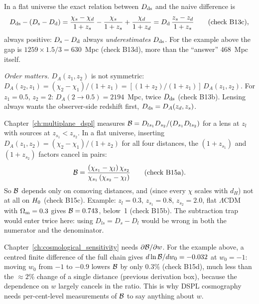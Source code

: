 \begin{annotation}
In a flat universe the exact relation between $D_{\mathrm{ds}}$ and the naive difference is
\[
  D_{\mathrm{ds}} - (D_{\mathrm{s}} - D_{\mathrm{d}}) = \frac{\chi_s - \chi_d}{1+z_s} - \frac{\chi_s}{1+z_s}
  + \frac{\chi_d}{1+z_d}
  = D_{\mathrm{d}}\,\frac{z_s - z_d}{1+z_s}
  \qquad(\text{check B13c}),
\]
always positive: $D_{\mathrm{s}} - D_{\mathrm{d}}$ always \emph{underestimates} $D_{\mathrm{ds}}$.  For the
example above the gap is $1259 \times 1.5/3 = 630$~Mpc (check B13d), more than
the ``answer'' $468$~Mpc itself.

\textit{Order matters.}  $D_A(z_1,z_2)$ is not symmetric:
$D_A(z_2,z_1) = (\chi_2-\chi_1)/(1+z_1) = [(1+z_2)/(1+z_1)]\,D_A(z_1,z_2)$.  For
$z_1 = 0.5$, $z_2 = 2$: $D_A(2\to0.5) = 2194$~Mpc, twice $D_{\mathrm{ds}}$ (check B13b).
Lensing always wants the observer-side redshift first, $D_{\mathrm{ds}} = D_A(z_d,z_s)$.
\end{annotation}

\begin{bridge}
Chapter~\ref{ch:multiplane_dspl} measures
$\mathcal{B} = D_{ls_1}D_{s_2}/(D_{s_1}D_{ls_2})$ for a lens at $z_l$ with sources at
$z_{s_1} < z_{s_2}$.  In a flat universe, inserting
$D_A(z_1,z_2) = (\chi_2-\chi_1)/(1+z_2)$ for all four distances, the
$(1+z_{s_1})$ and $(1+z_{s_2})$ factors cancel in pairs:
\[
  \mathcal{B} = \frac{(\chi_{s_1} - \chi_l)\,\chi_{s_2}}{\chi_{s_1}\,(\chi_{s_2} - \chi_l)}
  \qquad(\text{check B15a}).
\]
So $\mathcal{B}$ depends only on comoving distances, and (since every $\chi$ scales
with $d_H$) not at all on $H_0$ (check B15c).  Example:
$z_l = 0.3$, $z_{s_1} = 0.8$, $z_{s_2} = 2.0$, flat $\Lambda$CDM with
$\Omega_{\mathrm{m}} = 0.3$ gives $\mathcal{B} = 0.743$, below~1 (check B15b).  The
subtraction trap would enter twice here: using $D_{ls} = D_s - D_l$ would be wrong
in both the numerator and the denominator.
\end{bridge}

\begin{bridge}
Chapter~\ref{ch:cosmological_sensitivity} needs $\partial\mathcal{B}/\partial w$.  For
the example above, a centred finite difference of the full chain gives
$d\ln\mathcal{B}/dw_0 = -0.032$ at $w_0 = -1$: moving $w_0$ from $-1$ to $-0.9$
lowers $\mathcal{B}$ by only $0.3\%$ (check B15d), much less than the $\approx 2\%$
change of a single distance (previous derivation box), because the dependence on
$w$ largely cancels in the ratio.  This is why DSPL cosmography needs
per-cent-level measurements of $\mathcal{B}$ to say anything about $w$.
\end{bridge}

